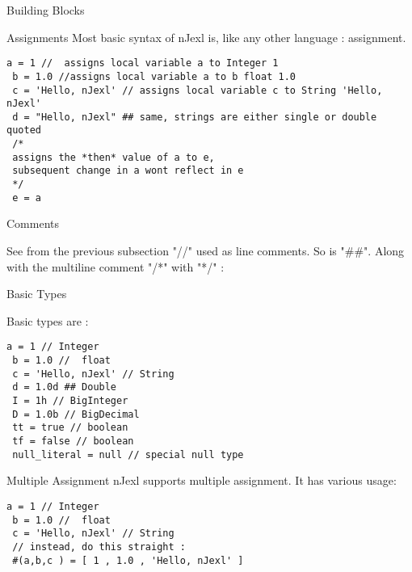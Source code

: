 \begin{section}{Building Blocks}
\begin{subsection}{Assignments}
Most basic syntax of nJexl is, like any other language : assignment.
\begin{center}\begin{minipage}{\linewidth}
\begin{lstlisting}[style=JexlStyle]
 a = 1 //  assigns local variable a to Integer 1
 b = 1.0 //assigns local variable a to b float 1.0
 c = 'Hello, nJexl' // assigns local variable c to String 'Hello, nJexl'
 d = "Hello, nJexl" ## same, strings are either single or double quoted 
 /* 
 assigns the *then* value of a to e, 
 subsequent change in a wont reflect in e 
 */
 e = a 
\end{lstlisting}
\end{minipage}\end{center}
\end{subsection}

\begin{subsection}{Comments}

See from the previous subsection "//" used as line comments. So is "\#\#".
Along with the multiline comment "/*" with  "*/" :

\end{subsection}


\begin{subsection}{Basic Types}

Basic types are :
\begin{center}\begin{minipage}{\linewidth}
\begin{lstlisting}[style=JexlStyle]
 a = 1 // Integer 
 b = 1.0 //  float 
 c = 'Hello, nJexl' // String 
 d = 1.0d ## Double 
 I = 1h // BigInteger 
 D = 1.0b // BigDecimal  
 tt = true // boolean 
 tf = false // boolean 
 null_literal = null // special null type
\end{lstlisting}
\end{minipage}\end{center}

\end{subsection}

\begin{subsection}{Multiple Assignment}
nJexl supports multiple assignment. It has various usage:

\begin{lstlisting}[style=JexlStyle]
 a = 1 // Integer 
 b = 1.0 //  float 
 c = 'Hello, nJexl' // String 
 // instead, do this straight :
 #(a,b,c ) = [ 1 , 1.0 , 'Hello, nJexl' ]   
\end{lstlisting}
\end{subsection}
\end{section}

